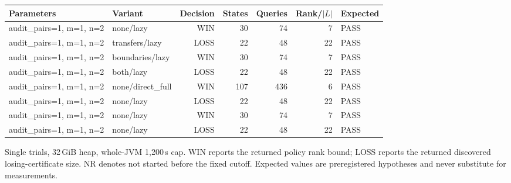 \begin{longtable}{llrrrrl}
\toprule
Parameters & Variant & Decision & States & Queries & Rank/$|L|$ & Expected \\
\midrule
\endhead
audit\_pairs=1, m=1, n=2 & none/lazy & WIN & 30 & 74 & 7 & PASS \\
audit\_pairs=1, m=1, n=2 & transfers/lazy & LOSS & 22 & 48 & 22 & PASS \\
audit\_pairs=1, m=1, n=2 & boundaries/lazy & WIN & 30 & 74 & 7 & PASS \\
audit\_pairs=1, m=1, n=2 & both/lazy & LOSS & 22 & 48 & 22 & PASS \\
audit\_pairs=1, m=1, n=2 & none/direct\_full & WIN & 107 & 436 & 6 & PASS \\
audit\_pairs=1, m=1, n=2 & none/lazy & LOSS & 22 & 48 & 22 & PASS \\
audit\_pairs=1, m=1, n=2 & none/lazy & WIN & 30 & 74 & 7 & PASS \\
audit\_pairs=1, m=1, n=2 & none/lazy & LOSS & 22 & 48 & 22 & PASS \\
\bottomrule
\end{longtable}
{\par\smallskip\footnotesize Single trials, 32\,GiB heap, whole-JVM 1,200\,s cap. WIN reports the returned policy rank bound; LOSS reports the returned discovered losing-certificate size. NR denotes not started before the fixed cutoff. Expected values are preregistered hypotheses and never substitute for measurements.}
